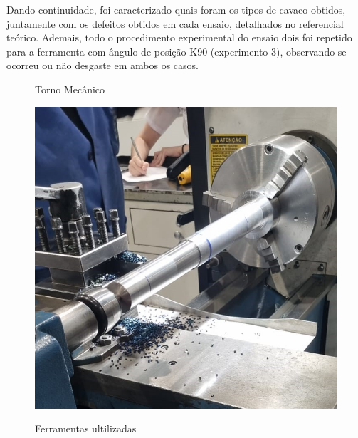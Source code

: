 \documentclass[deposito, acronym, symbols]{fei}
\begin{document}
Dando continuidade, foi caracterizado quais foram os tipos de cavaco obtidos, juntamente com os defeitos obtidos em cada ensaio, detalhados no referencial teórico. Ademais, todo o procedimento experimental do ensaio dois foi repetido para a ferramenta com ângulo de posição K90 (experimento 3), observando se ocorreu ou não desgaste em ambos os casos.

\begin{figure}[!htp]
  \centering
  \begin{minipage}{0.4\textwidth}
    \centering
    \caption{Torno Mecânico}
    \includegraphics[width=1\linewidth]{Imagens/Exp03_torneamento.jpeg}
    \label{fig:CNC}
  \end{minipage}
  \hfill
  \begin{minipage}{0.4\textwidth}
        \caption{Ferramentas ultilizadas}

\end{minipage}
\end{figure}
\end{document}
